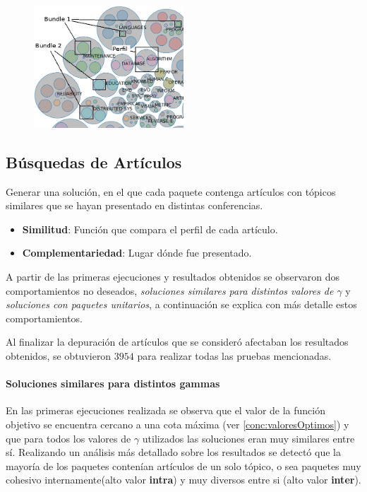 \begin{figure}[H]
  \centering
    \includegraphics[width=0.5\textwidth]{img/explain-bubbles.png}
  \caption{}
  \label{res:img-explain-bubbles}
\end{figure}



\subsection{Búsquedas de Artículos}\label{res:busPaper}
Generar una solución, en el que cada paquete contenga artículos con tópicos similares que se hayan presentado en distintas conferencias.
\begin{itemize}
  \item \textbf{Similitud}: Función que compara el perfil de cada artículo.
  \item \textbf{Complementariedad}: Lugar dónde fue presentado.
\end{itemize}

A partir de las primeras ejecuciones y resultados obtenidos se observaron dos comportamientos no deseados, \textit{soluciones similares para distintos valores de $\gamma$} y \textit{soluciones con paquetes unitarios}, a continuación se explica con más detalle estos comportamientos.

Al finalizar la depuración de artículos que se consideró afectaban los resultados obtenidos, se obtuvieron $3954$ para realizar todas las pruebas mencionadas.
\paragraph{Soluciones similares para distintos gammas}
En las primeras ejecuciones realizada se observa que el valor de la función objetivo se encuentra cercano a una cota máxima (ver \ref{conc:valoresOptimos}) y que para todos los valores de $\gamma$ utilizados las soluciones eran muy similares entre sí. Realizando un análisis más detallado sobre los resultados se detectó que la mayoría de los paquetes contenían artículos de un solo tópico, o sea paquetes  muy cohesivo internamente(alto valor \textbf{intra}) y muy diversos entre si (alto valor \textbf{inter}).

